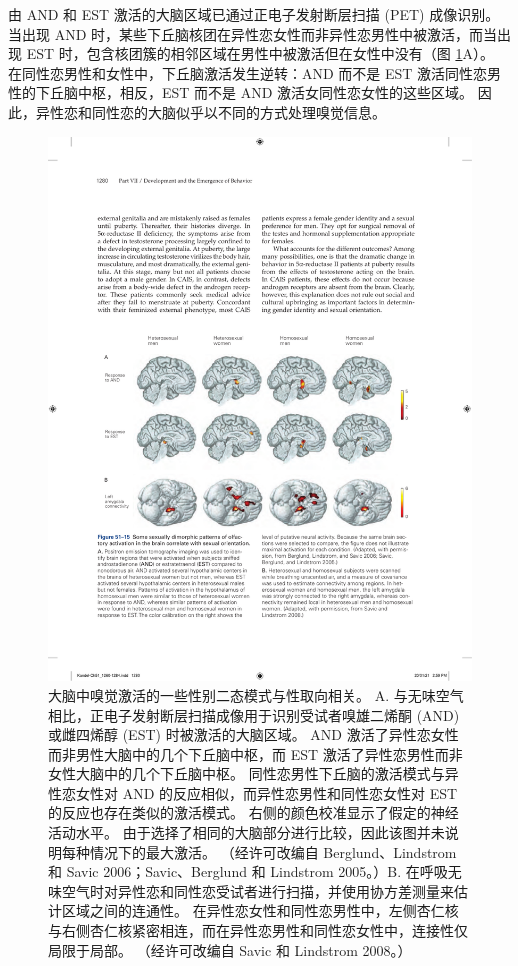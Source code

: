 由 AND 和 EST 激活的大脑区域已通过正电子发射断层扫描 (PET) 成像识别。
当出现 AND 时，某些下丘脑核团在异性恋女性而非异性恋男性中被激活，而当出现 EST 时，包含核团簇的相邻区域在男性中被激活但在女性中没有（图 \ref{fig:51_15}A）。
在同性恋男性和女性中，下丘脑激活发生逆转：AND 而不是 EST 激活同性恋男性的下丘脑中枢，相反，EST 而不是 AND 激活女同性恋女性的这些区域。
因此，异性恋和同性恋的大脑似乎以不同的方式处理嗅觉信息。


\begin{figure}[htbp]
	\centering
	\includegraphics[width=0.9\linewidth]{chap51/fig_51_15}
	\caption{大脑中嗅觉激活的一些性别二态模式与性取向相关。 A. 与无味空气相比，正电子发射断层扫描成像用于识别受试者嗅雄二烯酮 (AND) 或雌四烯醇 (EST) 时被激活的大脑区域。 AND 激活了异性恋女性而非男性大脑中的几个下丘脑中枢，而 EST 激活了异性恋男性而非女性大脑中的几个下丘脑中枢。 同性恋男性下丘脑的激活模式与异性恋女性对 AND 的反应相似，而异性恋男性和同性恋女性对 EST 的反应也存在类似的激活模式。 右侧的颜色校准显示了假定的神经活动水平。 由于选择了相同的大脑部分进行比较，因此该图并未说明每种情况下的最大激活。 （经许可改编自 Berglund、Lindstrom 和 Savic 2006；Savic、Berglund 和 Lindstrom 2005。）B. 在呼吸无味空气时对异性恋和同性恋受试者进行扫描，并使用协方差测量来估计区域之间的连通性。 在异性恋女性和同性恋男性中，左侧杏仁核与右侧杏仁核紧密相连，而在异性恋男性和同性恋女性中，连接性仅局限于局部。 （经许可改编自 Savic 和 Lindstrom 2008。）}
	\label{fig:51_15}
\end{figure}


